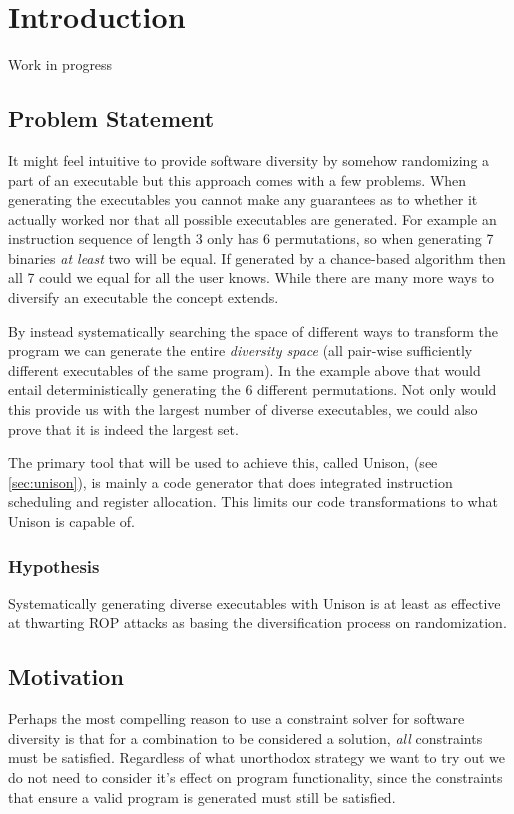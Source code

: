 \chapter{Introduction}

Work in progress

\section{Problem Statement}

It might feel intuitive to provide software diversity by somehow randomizing a part of an
executable but this approach comes with a few problems. When generating the executables
you cannot make any guarantees as to whether it actually worked nor that all possible executables
are generated. For example an instruction sequence of length 3 only has 6 permutations, so
when generating 7 binaries \textit{at least} two will be equal. If generated by a chance-based
algorithm then all 7 could we equal for all the user knows. While there are many more ways
to diversify an executable the concept extends.

By instead systematically searching the space of different ways to transform the program
we can generate the entire \textit{diversity space} (all pair-wise sufficiently different
executables of the same program). In the example above that would entail deterministically
generating the 6 different permutations. Not only would this provide us with the largest
number of diverse executables, we could also prove that it is indeed the largest set.

The primary tool that will be used to achieve this, called Unison, (see \ref{sec:unison}),
is mainly a code generator that does integrated instruction scheduling and register
allocation. This limits our code transformations to what Unison is capable of.

\subsection{Hypothesis}

Systematically generating diverse executables with Unison is at least as effective at
thwarting ROP attacks as basing the diversification process on randomization.

\section{Motivation}

Perhaps the most compelling reason to use a constraint solver for software diversity is that
for a combination to be considered a solution, \textit{all} constraints must be satisfied.
Regardless of what unorthodox strategy we want to try out we do not need to consider it's
effect on program functionality, since the constraints that ensure a valid program is
generated must still be satisfied.
